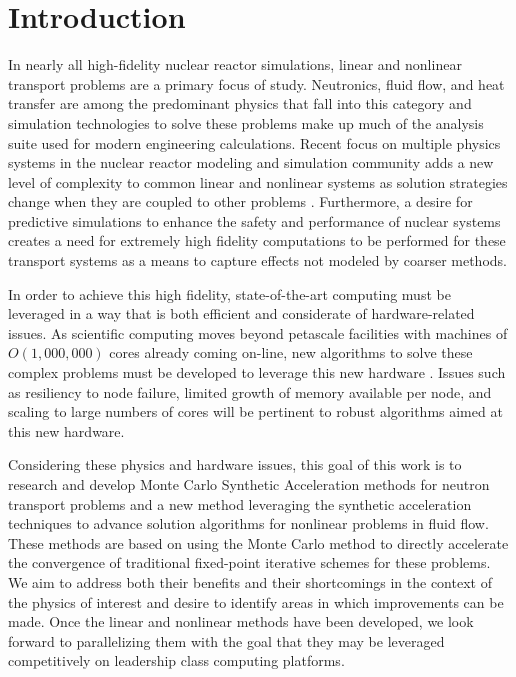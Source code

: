 \chapter{Introduction}
\label{ch:introduction}
In nearly all high-fidelity nuclear reactor simulations, linear and
nonlinear transport problems are a primary focus of study. Neutronics,
fluid flow, and heat transfer are among the predominant physics that
fall into this category and simulation technologies to solve these
problems make up much of the analysis suite used for modern
engineering calculations. Recent focus on multiple physics systems in
the nuclear reactor modeling and simulation community adds a new level
of complexity to common linear and nonlinear systems as solution
strategies change when they are coupled to other problems
\cite{u.s._department_of_energy_casl_2011}. Furthermore, a desire for
predictive simulations to enhance the safety and performance of
nuclear systems creates a need for extremely high fidelity
computations to be performed for these transport systems as a means to
capture effects not modeled by coarser methods.

In order to achieve this high fidelity, state-of-the-art computing
 must be leveraged in a way that is both efficient
and considerate of hardware-related issues. As scientific computing
moves beyond petascale facilities with machines of $O(1,000,000)$
cores already coming on-line, new algorithms to solve these complex
problems must be developed to leverage this new hardware
\cite{kogge_using_2011}. Issues such as resiliency to node failure,
limited growth of memory available per node, and scaling to large
numbers of cores will be pertinent to robust algorithms aimed at this
new hardware. 

Considering these physics and hardware issues, this goal of this work
is to research and develop Monte Carlo Synthetic Acceleration methods
for neutron transport problems and a new method leveraging the
synthetic acceleration techniques to advance solution algorithms for
nonlinear problems in fluid flow. These methods are based on using the
Monte Carlo method to directly accelerate the convergence of
traditional fixed-point iterative schemes for these problems. We aim
to address both their benefits and their shortcomings in the context
of the physics of interest and desire to identify areas in which
improvements can be made. Once the linear and nonlinear methods have
been developed, we look forward to parallelizing them with the goal
that they may be leveraged competitively on leadership class computing
platforms.

